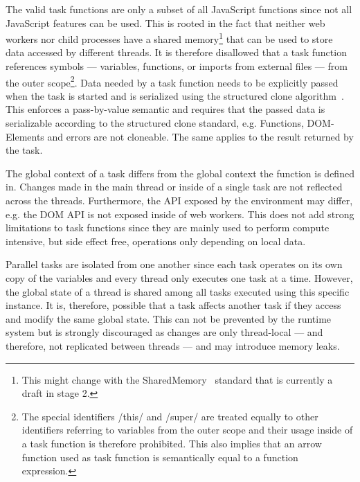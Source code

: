 The valid task functions are only a subset of all JavaScript functions since not all JavaScript features can be used. This is rooted in the fact that neither web workers nor child processes have a shared memory\footnote{This might change with the SharedMemory~\cite{Ecma2016} standard that is currently a draft in stage 2.} that can be used to store data accessed by different threads. It is therefore disallowed that a task function references symbols --- variables, functions, or imports from external files --- from the outer scope\footnote{The special identifiers \javascriptinline/this/ and \javascriptinline/super/ are treated equally to other identifiers referring to variables from the outer scope and their usage inside of a task function is therefore prohibited. This also implies that an arrow function used as task function is semantically equal to a function expression.}. Data needed by a task function needs to be explicitly passed when the task is started and is serialized using the structured clone algorithm~\cite[Section 2.9.4]{WHATWG2016}. This enforces a pass-by-value semantic and requires that the passed data is serializable according to the structured clone standard, e.g. Functions, DOM-Elements and errors are not cloneable. The same applies to the result returned by the task. 

The global context of a task differs from the global context the function is defined in. Changes made in the main thread or inside of a single task are not reflected across the threads. Furthermore, the API exposed by the environment may differ, e.g. the DOM API is not exposed inside of web workers. This does not add strong limitations to task functions since they are mainly used to perform compute intensive, but side effect free,  operations only depending on local data.

Parallel tasks are isolated from one another since each task operates on its own copy of the variables and every thread only executes one task at a time. However, the global state of a thread is shared among all tasks executed using this specific instance. It is, therefore, possible that a task affects another task if they access and modify the same global state. This can not be prevented by the runtime system but is strongly discouraged as changes are only thread-local --- and therefore, not replicated between threads --- and may introduce memory leaks. 

